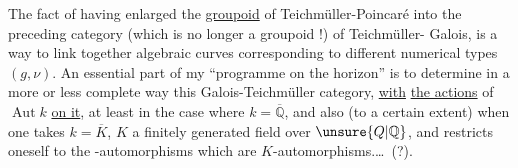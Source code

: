 The fact of having enlarged the \uline{groupoid} of
Teichmüller-Poincaré into the preceding category (which is
no longer a groupoid !) of Teichmüller-
Galois, is a   way
to link together algebraic curves corresponding
to different numerical types $(g,\nu)$.
An essential part of my ``programme
on the horizon'' is to determine in a
more or less complete way this
Galois-Teichmüller category,  \uline{with} \uline{the actions}
of $\operatorname{Aut}k$ \uline{on it}, at least in
the case where $k=\overline{\mathbb Q}$, and also (to a
certain extent) when one takes 
$k=\overline K$, $K$ a finitely generated field over $\unsure{Q|\mathbb Q}$, and
restricts oneself to the -automorphisms  which
are $K$-automorphisms.\ldots\ (?).
